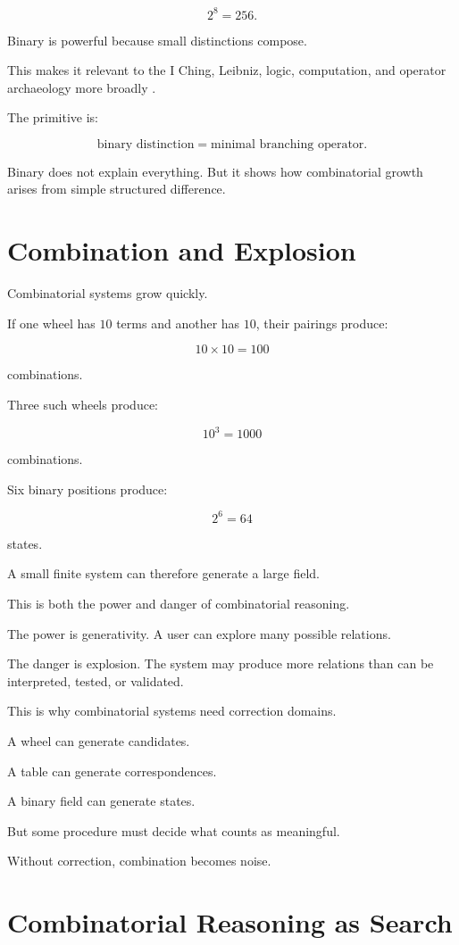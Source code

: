 \documentclass[11pt]{book}
\begin{document}
\[
2^8 = 256.
\]

Binary is powerful because small distinctions compose.

This makes it relevant to the I Ching, Leibniz, logic, computation, and operator archaeology more broadly \cite{WilhelmBaynes1967IChing,Shaughnessy1996IChing,Leibniz1697Binary}.

The primitive is:

\[
\text{binary distinction} = \text{minimal branching operator}.
\]

Binary does not explain everything. But it shows how combinatorial growth arises from simple structured difference.

\section{Combination and Explosion}

Combinatorial systems grow quickly.

If one wheel has \(10\) terms and another has \(10\), their pairings produce:

\[
10 \times 10 = 100
\]

combinations.

Three such wheels produce:

\[
10^3 = 1000
\]

combinations.

Six binary positions produce:

\[
2^6 = 64
\]

states.

A small finite system can therefore generate a large field.

This is both the power and danger of combinatorial reasoning.

The power is generativity. A user can explore many possible relations.

The danger is explosion. The system may produce more relations than can be interpreted, tested, or validated.

This is why combinatorial systems need correction domains.

A wheel can generate candidates.

A table can generate correspondences.

A binary field can generate states.

But some procedure must decide what counts as meaningful.

Without correction, combination becomes noise.

\section{Combinatorial Reasoning as Search}
\end{document}
